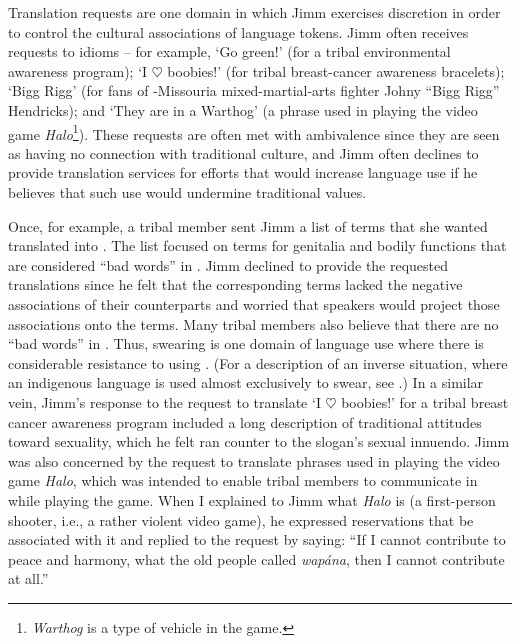 \documentclass[output=paper]{LSP/langsci}
\begin{document}
Translation requests are one domain in which Jimm exercises discretion in order to control the cultural associations of  language tokens. Jimm often receives requests to   idioms -- for example, `Go green!' (for a tribal environmental awareness program); `I $\heartsuit$ boobies!' (for tribal breast-cancer awareness bracelets); `Bigg Rigg' (for fans of -Missouria mixed-martial-arts fighter Johny ``Bigg Rigg'' Hendricks); and `They are in a Warthog' (a phrase used in playing the video game \emph{Halo}\footnote{\emph{Warthog} is a type of vehicle in the game.}). These requests are often met with ambivalence since they are seen as having no connection with traditional culture, and Jimm often declines to provide translation services for efforts that would increase  language use if he believes that such use would undermine traditional values.

Once, for example, a tribal member sent Jimm a list of  terms that she wanted translated into . The list focused on terms for genitalia and bodily functions that are considered ``bad words'' in . Jimm declined to provide the requested translations since he felt that the corresponding  terms lacked the negative associations of their  counterparts and worried that  speakers would project those associations onto the  terms. Many tribal members also believe that there are no ``bad words'' in . Thus, swearing is one domain of language use where there is considerable resistance to using . (For a description of an inverse situation, where an indigenous language is used almost exclusively to swear, see \citealt{Muehlmann2008}.) In a similar vein, Jimm's response to the request to translate `I $\heartsuit$ boobies!' for a tribal breast cancer awareness program included a long description of traditional attitudes toward sexuality, which he felt ran counter to the slogan's sexual innuendo. Jimm was also concerned by the request to translate phrases used in playing the video game \emph{Halo}, which was intended to enable tribal members to communicate in  while playing the game. When I explained to Jimm what \emph{Halo} is (a first-person shooter, i.e., a rather violent video game), he expressed reservations that  be associated with it and replied to the request by saying: ``If I cannot contribute to peace and harmony, what the old people called \emph{wapána}, then I cannot contribute at all.''
\end{document}
